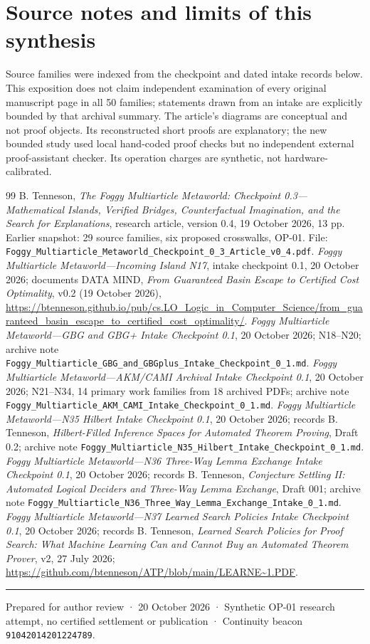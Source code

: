 \documentclass[11pt,letterpaper,oneside]{article}
\begin{document}
\section{Source notes and limits of this synthesis}
Source families were indexed from the checkpoint and dated intake records below. This exposition does not claim independent examination of every original manuscript page in all 50 families; statements drawn from an intake are explicitly bounded by that archival summary. The article's diagrams are conceptual and not proof objects. Its reconstructed short proofs are explanatory; the new bounded study used local hand-coded proof checks but no independent external proof-assistant checker. Its operation charges are synthetic, not hardware-calibrated.

\begin{thebibliography}{99}\small
{} B. Tenneson, \emph{The Foggy Multiarticle Metaworld: Checkpoint 0.3---Mathematical Islands, Verified Bridges, Counterfactual Imagination, and the Search for Explanations}, research article, version 0.4, 19 October 2026, 13 pp. Earlier snapshot: 29 source families, six proposed crosswalks, OP-01. File: \texttt{Foggy\_Multiarticle\_Metaworld\_Checkpoint\_0\_3\_Article\_v0\_4.pdf}.
 \emph{Foggy Multiarticle Metaworld---Incoming Island N17}, intake checkpoint 0.1, 20 October 2026; documents DATA MIND, \emph{From Guaranteed Basin Escape to Certified Cost Optimality}, v0.2 (19 October 2026), \url{https://btenneson.github.io/pub/cs.LO_Logic_in_Computer_Science/from_guaranteed_basin_escape_to_certified_cost_optimality/}.
 \emph{Foggy Multiarticle Metaworld---GBG and GBG+ Intake Checkpoint 0.1}, 20 October 2026; N18--N20; archive note \texttt{Foggy\_Multiarticle\_GBG\_and\_GBGplus\_Intake\_Checkpoint\_0\_1.md}.
 \emph{Foggy Multiarticle Metaworld---AKM/CAMI Archival Intake Checkpoint 0.1}, 20 October 2026; N21--N34, 14 primary work families from 18 archived PDFs; archive note \texttt{Foggy\_Multiarticle\_AKM\_CAMI\_Intake\_Checkpoint\_0\_1.md}.
 \emph{Foggy Multiarticle Metaworld---N35 Hilbert Intake Checkpoint 0.1}, 20 October 2026; records B. Tenneson, \emph{Hilbert-Filled Inference Spaces for Automated Theorem Proving}, Draft 0.2; archive note \texttt{Foggy\_Multiarticle\_N35\_Hilbert\_Intake\_Checkpoint\_0\_1.md}.
 \emph{Foggy Multiarticle Metaworld---N36 Three-Way Lemma Exchange Intake Checkpoint 0.1}, 20 October 2026; records B. Tenneson, \emph{Conjecture Settling II: Automated Logical Deciders and Three-Way Lemma Exchange}, Draft 001; archive note \texttt{Foggy\_Multiarticle\_N36\_Three\_Way\_Lemma\_Exchange\_Intake\_0\_1.md}.
 \emph{Foggy Multiarticle Metaworld---N37 Learned Search Policies Intake Checkpoint 0.1}, 20 October 2026; records B. Tenneson, \emph{Learned Search Policies for Proof Search: What Machine Learning Can and Cannot Buy an Automated Theorem Prover}, v2, 27 July 2026; \url{https://github.com/btenneson/ATP/blob/main/LEARNE~1.PDF}.
\end{thebibliography}
\vspace{.12in}\hrule\vspace{.12in}
{\footnotesize\sffamily\color{graytext}Prepared for author review · 20 October 2026 · Synthetic OP-01 research attempt, no certified settlement or publication · Continuity beacon \texttt{91042014201224789}.}
\end{document}
